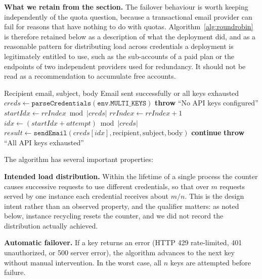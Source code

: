 \documentclass[11pt,a4paper]{article}
\theoremstyle{plain}
\theoremstyle{definition}
\theoremstyle{remark}
\begin{document}
\textbf{What we retain from the section.} The failover behaviour is worth keeping independently of the quota question, because a transactional email provider can fail for reasons that have nothing to do with quotas. Algorithm~\ref{alg:roundrobin} is therefore retained below as a description of what the deployment did, and as a reasonable pattern for distributing load across credentials a deployment is legitimately entitled to use, such as the sub-accounts of a paid plan or the endpoints of two independent providers used for redundancy. It should not be read as a recommendation to accumulate free accounts.

\begin{algorithm}[htbp]
\caption{Round-Robin API Key Rotation with Failover}
\label{alg:roundrobin}
\small
\begin{algorithmic}[1]
\REQUIRE Recipient email, subject, body
\ENSURE Email sent successfully or all keys exhausted
\STATE $\mathit{creds} \gets \texttt{parseCredentials}(\texttt{env.MULTI\_KEYS})$
    \STATE \textbf{throw} ``No API keys configured''
\ENDIF
\STATE $\mathit{startIdx} \gets \mathit{rrIndex} \bmod |\mathit{creds}|$ 
\STATE $\mathit{rrIndex} \gets \mathit{rrIndex} + 1$ 
    \STATE $\mathit{idx} \gets (\mathit{startIdx} + \mathit{attempt}) \bmod |\mathit{creds}|$
    \STATE $\mathit{result} \gets \texttt{sendEmail}(\mathit{creds}[\mathit{idx}], \text{recipient}, \text{subject}, \text{body})$
        \RETURN {}
    \ENDIF
        \STATE \textbf{continue} 
    \ENDIF
\ENDFOR
\STATE \textbf{throw} ``All API keys exhausted''
\end{algorithmic}
\end{algorithm}

The algorithm has several important properties:

\textbf{Intended load distribution.} Within the lifetime of a single process the counter causes successive requests to use different credentials, so that over $m$ requests served by one instance each credential receives about $m/n$. This is the design intent rather than an observed property, and the qualifier matters: as noted below, instance recycling resets the counter, and we did not record the distribution actually achieved.

\textbf{Automatic failover.} If a key returns an error (HTTP 429 rate-limited, 401 unauthorized, or 500 server error), the algorithm advances to the next key without manual intervention. In the worst case, all $n$ keys are attempted before failure.
\end{document}
